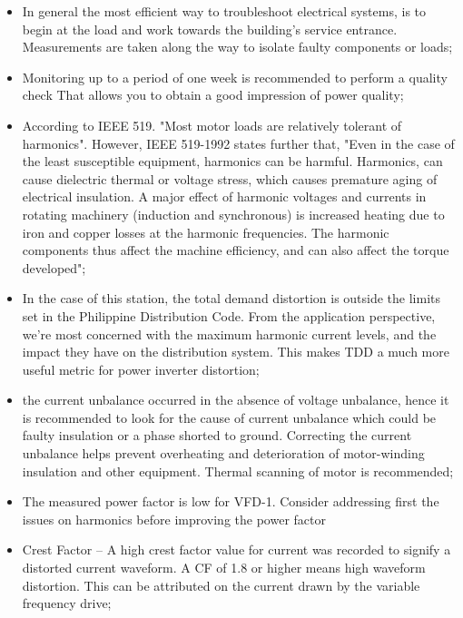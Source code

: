\begin{itemize}
	
	\item In general the most efficient way to troubleshoot electrical systems, is to begin at
	the load and work towards the building’s service entrance. Measurements are taken along the way to isolate faulty components or loads;
	
	\item 	Monitoring up to a period of one week is recommended to perform a quality check 
	That allows you to obtain a good impression of power quality; 
	
	\item 	According to IEEE 519. "Most motor loads are relatively tolerant of harmonics". However, IEEE 519-1992 states further that, "Even in the case of the least susceptible equipment, harmonics can be harmful. Harmonics, can cause dielectric thermal or voltage stress, which causes premature aging of electrical insulation. A major effect of harmonic voltages and currents in rotating machinery (induction and synchronous) is increased heating due to iron and copper losses at the harmonic frequencies. The harmonic components thus affect the machine efficiency, and can also affect the torque developed"; 
	
	\item  	In the case of this station, the total demand distortion is outside the limits set in the Philippine Distribution Code. From the application perspective, we're most concerned with the maximum harmonic current levels, and the impact they have on the distribution system. This makes TDD a much more useful metric for power inverter distortion; 
	
	\item  the current unbalance occurred in the absence of voltage unbalance, hence it is recommended to look for the cause of current unbalance which could be faulty insulation or a phase shorted to ground. Correcting the current unbalance helps prevent overheating and deterioration of motor-winding insulation and other equipment. Thermal scanning of motor is recommended;
	
	\item The measured power factor is low for VFD-1. Consider addressing first the issues on harmonics before improving the power factor
	
	\item 	Crest Factor – A high crest factor value for current was recorded to signify a   distorted current waveform. A CF of 1.8 or higher means high waveform distortion. This can be attributed on the current drawn by the variable frequency drive;
	

\end{itemize}
